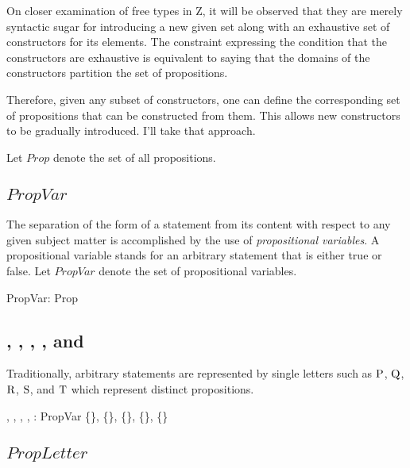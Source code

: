 \documentclass[11pt, oneside]{article}
\begin{document}
On closer examination of free types in Z, it will be observed that they are merely syntactic sugar for introducing a new given set
along with an exhaustive set of constructors for its elements.
The constraint expressing the condition that the constructors are exhaustive is equivalent to saying that the domains of the constructors
partition the set of propositions.

Therefore, given any subset of constructors, one can define the corresponding set of propositions that can be constructed from them.
This allows new constructors to be gradually introduced.
I'll take that approach.

Let $Prop$ denote the set of all propositions.

\begin{zed}
	[Prop]
\end{zed}

\subsection{$PropVar$}

The separation of the form of a statement from its content with respect to any given subject matter is accomplished by 
the use of {\it propositional variables}. 
A propositional variable stands for an arbitrary statement that is either true or false.
Let $PropVar$ denote the set of propositional variables.

\begin{axdef}
	PropVar: \power Prop
\end{axdef}

\subsection{, , , , and }

Traditionally, arbitrary statements are represented by single letters such as
$\mathrm{P}$, $\mathrm{Q}$, $\mathrm{R}$, $\mathrm{S}$, and $\mathrm{T}$ which represent distinct propositions.

\begin{axdef}
	\propP, \propQ, \propR, \propS, \propT: PropVar
\where
	\disjoint \langle \{\propP\}, \{\propQ\}, \{\propR\}, \{\propS\}, \{\propT\} \rangle
\end{axdef}

\subsection{$PropLetter$}
\end{document}
